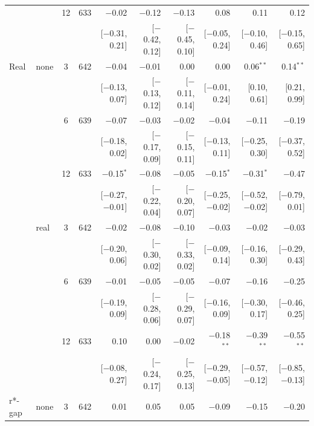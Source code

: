 \begin{longtable}{llcrrrrrrr}
 &  & 12 & 633 & $-$0.02 & $-$0.12 & $-$0.13 & 0.08 & 0.11 & 0.12\\
 & & & & {\scriptsize [$-$0.31, 0.21]} & {\scriptsize [$-$0.42, 0.12]} & {\scriptsize [$-$0.45, 0.10]} & {\scriptsize [$-$0.05, 0.24]} & {\scriptsize [$-$0.10, 0.46]} & {\scriptsize [$-$0.15, 0.65]}\\
\addlinespace
Real & none & 3 & 642 & $-$0.04 & $-$0.01 & 0.00 & 0.00 & 0.06$^{**}$ & 0.14$^{**}$\\
 & & & & {\scriptsize [$-$0.13, 0.07]} & {\scriptsize [$-$0.13, 0.12]} & {\scriptsize [$-$0.11, 0.14]} & {\scriptsize [$-$0.01, 0.24]} & {\scriptsize [0.10, 0.61]} & {\scriptsize [0.21, 0.99]}\\
 &  & 6 & 639 & $-$0.07 & $-$0.03 & $-$0.02 & $-$0.04 & $-$0.11 & $-$0.19\\
 & & & & {\scriptsize [$-$0.18, 0.02]} & {\scriptsize [$-$0.17, 0.09]} & {\scriptsize [$-$0.15, 0.11]} & {\scriptsize [$-$0.13, 0.11]} & {\scriptsize [$-$0.25, 0.30]} & {\scriptsize [$-$0.37, 0.52]}\\
 &  & 12 & 633 & $-$0.15$^{*}$ & $-$0.08 & $-$0.05 & $-$0.15$^{*}$ & $-$0.31$^{*}$ & $-$0.47\\
 & & & & {\scriptsize [$-$0.27, $-$0.01]} & {\scriptsize [$-$0.22, 0.04]} & {\scriptsize [$-$0.20, 0.07]} & {\scriptsize [$-$0.25, $-$0.02]} & {\scriptsize [$-$0.52, $-$0.02]} & {\scriptsize [$-$0.79, 0.01]}\\
 & real & 3 & 642 & $-$0.02 & $-$0.08 & $-$0.10 & $-$0.03 & $-$0.02 & $-$0.03\\
 & & & & {\scriptsize [$-$0.20, 0.06]} & {\scriptsize [$-$0.30, 0.02]} & {\scriptsize [$-$0.33, 0.02]} & {\scriptsize [$-$0.09, 0.14]} & {\scriptsize [$-$0.16, 0.30]} & {\scriptsize [$-$0.29, 0.43]}\\
 &  & 6 & 639 & $-$0.01 & $-$0.05 & $-$0.05 & $-$0.07 & $-$0.16 & $-$0.25\\
 & & & & {\scriptsize [$-$0.19, 0.09]} & {\scriptsize [$-$0.28, 0.06]} & {\scriptsize [$-$0.29, 0.07]} & {\scriptsize [$-$0.16, 0.09]} & {\scriptsize [$-$0.30, 0.17]} & {\scriptsize [$-$0.46, 0.25]}\\
 &  & 12 & 633 & 0.10 & 0.00 & $-$0.02 & $-$0.18$^{**}$ & $-$0.39$^{**}$ & $-$0.55$^{**}$\\
 & & & & {\scriptsize [$-$0.08, 0.27]} & {\scriptsize [$-$0.24, 0.17]} & {\scriptsize [$-$0.25, 0.13]} & {\scriptsize [$-$0.29, $-$0.05]} & {\scriptsize [$-$0.57, $-$0.12]} & {\scriptsize [$-$0.85, $-$0.13]}\\
\addlinespace
r*-gap & none & 3 & 642 & 0.01 & 0.05 & 0.05 & $-$0.09 & $-$0.15 & $-$0.20\\

\end{longtable}
